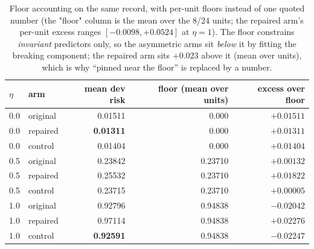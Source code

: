 \documentclass{neurips_2024}
\begin{document}
\begin{table}[t]
\centering
\caption{Floor accounting on the same record, with per-unit floors instead of one quoted
number (the "floor" column is the mean over the $8$/$24$ units; the repaired arm's per-unit
excess ranges $[-0.0098,+0.0524]$ at $\eta{=}1$). The floor constrains \emph{invariant}
predictors only, so the asymmetric arms sit
\emph{below} it by fitting the breaking component; the repaired arm sits $+0.023$ above it
(mean over units), which is why ``pinned near the floor'' is replaced by a number.}
\label{tab:floors}
\small
\begin{tabular}{@{}llrrr@{}}
\toprule
$\eta$ & arm & mean dev risk & floor (mean over units) & excess over floor \\
\midrule
0.0 & original & 0.01511 & 0.000 & $+0.01511$ \\
0.0 & repaired & \textbf{0.01311} & 0.000 & $+0.01311$ \\
0.0 & control  & 0.01404 & 0.000 & $+0.01404$ \\
\midrule
0.5 & original & 0.23842 & 0.23710 & $+0.00132$ \\
0.5 & repaired & 0.25532 & 0.23710 & $+0.01822$ \\
0.5 & control  & 0.23715 & 0.23710 & $+0.00005$ \\
\midrule
1.0 & original & 0.92796 & 0.94838 & $-0.02042$ \\
1.0 & repaired & 0.97114 & 0.94838 & $\mathbf{+0.02276}$ \\
1.0 & control  & \textbf{0.92591} & 0.94838 & $-0.02247$ \\
\bottomrule
\end{tabular}
\end{table}
\end{document}
